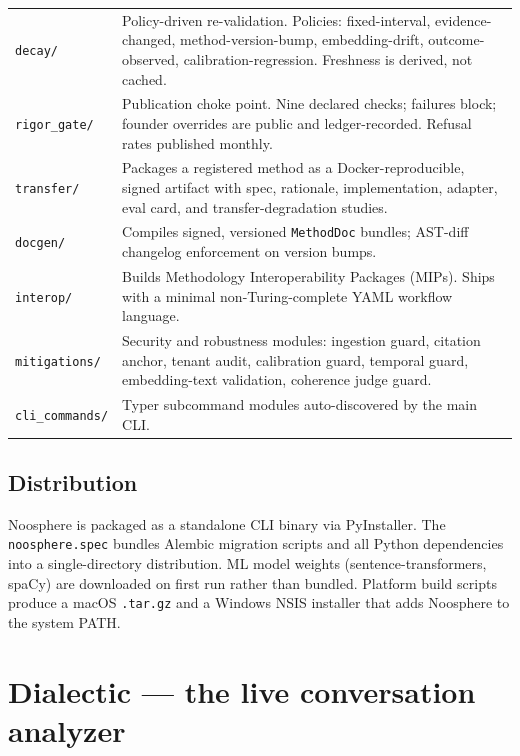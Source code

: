 \documentclass[11pt,letterpaper]{article}
\newcommand{\file}[1]{\texttt{#1}}
\begin{document}
\begin{longtable}{p{2.4cm} p{12.1cm}}
\file{decay/}         & Policy-driven re-validation. Policies: fixed-interval, evidence-changed, method-version-bump, embedding-drift, outcome-observed, calibration-regression. Freshness is derived, not cached. \\
\file{rigor\_gate/}   & Publication choke point. Nine declared checks; failures block; founder overrides are public and ledger-recorded. Refusal rates published monthly. \\
\file{transfer/}      & Packages a registered method as a Docker-reproducible, signed artifact with spec, rationale, implementation, adapter, eval card, and transfer-degradation studies. \\
\file{docgen/}        & Compiles signed, versioned \texttt{MethodDoc} bundles; AST-diff changelog enforcement on version bumps. \\
\file{interop/}       & Builds Methodology Interoperability Packages (MIPs). Ships with a minimal non-Turing-complete YAML workflow language. \\
\file{mitigations/}   & Security and robustness modules: ingestion guard, citation anchor, tenant audit, calibration guard, temporal guard, embedding-text validation, coherence judge guard. \\
\file{cli\_commands/} & Typer subcommand modules auto-discovered by the main CLI. \\
\bottomrule
\end{longtable}

\subsection{Distribution}

Noosphere is packaged as a standalone CLI binary via PyInstaller. The \file{noosphere.spec} bundles Alembic migration scripts and all Python dependencies into a single-directory distribution. ML model weights (sentence-transformers, spaCy) are downloaded on first run rather than bundled. Platform build scripts produce a macOS \file{.tar.gz} and a Windows NSIS installer that adds Noosphere to the system PATH.

\section{Dialectic --- the live conversation analyzer}
\end{document}
